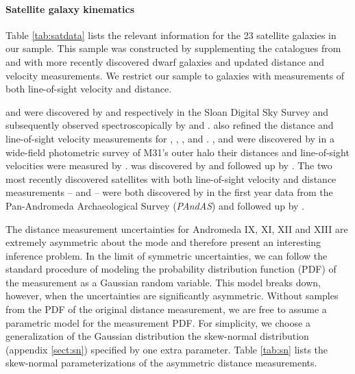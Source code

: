 \documentclass[preprint]{aastex}
\newcommand{\project}[1]{\emph{#1}}
\newcommand{\sdss}{\project{SDSS}}
\newcommand{\pandas}{\project{PAndAS}}
\begin{document}
\paragraph{Satellite galaxy kinematics}

Table \ref{tab:satdata} lists the relevant information for the 23 satellite
galaxies in our sample.  This sample was constructed by supplementing the
catalogues from \citet{Evans:2000a} and \cite{McConnachie:2006} with more
recently discovered dwarf galaxies and updated distance and velocity measurements.
We restrict our sample to galaxies with measurements of both line-of-sight
velocity and distance.

 and  were discovered by
\citet{Zucker:2004} and \citet{Zucker:2007} respectively in the Sloan Digital
Sky Survey \citep[\sdss;][]{York:2000} and subsequently observed spectroscopically
by \citet{Collins:2010} and \citet{Kalirai:2010}.  \citet{Kalirai:2010} also
refined the distance and line-of-sight velocity measurements for
, , ,
 and .  ,
 and  were discovered by
\citet{Martin:2006} in a wide-field photometric survey of M31's outer halo
their distances and line-of-sight velocities were measured by
\citet{Collins:2010}.   was discovered by
\citet{Majewski:2007} and followed up by \citet{Kalirai:2010}.  The two most
recently discovered satellites with both line-of-sight velocity and distance
measurements --  and  -- were
both discovered by \citet{Ibata:2007} in the first year data from the
Pan-Andromeda Archaeological Survey (\pandas) and followed up by \citet{Letarte:2009}.

The distance measurement uncertainties for Andromeda IX, XI, XII and XIII are
extremely asymmetric about the mode and therefore present an interesting
inference problem.  In the limit of symmetric uncertainties, we can follow the
standard procedure of modeling the probability distribution function (PDF) of
the measurement as a Gaussian random variable.  This model breaks down, however,
when the uncertainties are significantly asymmetric.  Without samples from the PDF
of the original distance measurement, we are free to assume a parametric model
for the measurement PDF.  For simplicity, we choose a generalization of the
Gaussian distribution the skew-normal distribution (appendix \ref{sect:sn})
specified by one extra parameter.  Table \ref{tab:sn} lists the skew-normal
parameterizations of the asymmetric distance measurements.
\end{document}
